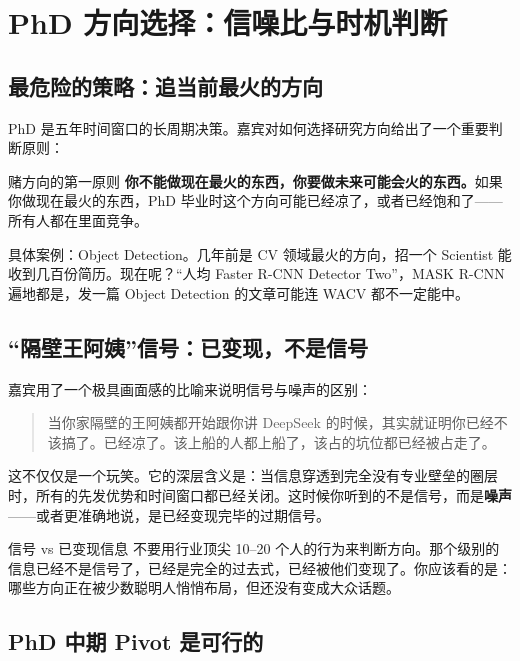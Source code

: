 \section{PhD 方向选择：信噪比与时机判断}

\subsection{最危险的策略：追当前最火的方向}

PhD 是五年时间窗口的长周期决策。嘉宾对如何选择研究方向给出了一个重要判断原则：

\begin{importantbox}{赌方向的第一原则}
\textbf{你不能做现在最火的东西，你要做未来可能会火的东西。}如果你做现在最火的东西，PhD 毕业时这个方向可能已经凉了，或者已经饱和了——所有人都在里面竞争。
\end{importantbox}

具体案例：Object Detection。几年前是 CV 领域最火的方向，招一个 Scientist 能收到几百份简历。现在呢？``人均 Faster R-CNN Detector Two''，MASK R-CNN 遍地都是，发一篇 Object Detection 的文章可能连 WACV 都不一定能中。

\subsection{``隔壁王阿姨''信号：已变现，不是信号}

嘉宾用了一个极具画面感的比喻来说明信号与噪声的区别：

\begin{quote}
当你家隔壁的王阿姨都开始跟你讲 DeepSeek 的时候，其实就证明你已经不该搞了。已经凉了。该上船的人都上船了，该占的坑位都已经被占走了。
\end{quote}

这不仅仅是一个玩笑。它的深层含义是：当信息穿透到完全没有专业壁垒的圈层时，所有的先发优势和时间窗口都已经关闭。这时候你听到的不是信号，而是\textbf{噪声}——或者更准确地说，是已经变现完毕的过期信号。

\begin{warningbox}{信号 vs 已变现信息}
不要用行业顶尖 10--20 个人的行为来判断方向。那个级别的信息已经不是信号了，已经是完全的过去式，已经被他们变现了。你应该看的是：哪些方向正在被少数聪明人悄悄布局，但还没有变成大众话题。
\end{warningbox}

\subsection{PhD 中期 Pivot 是可行的}

